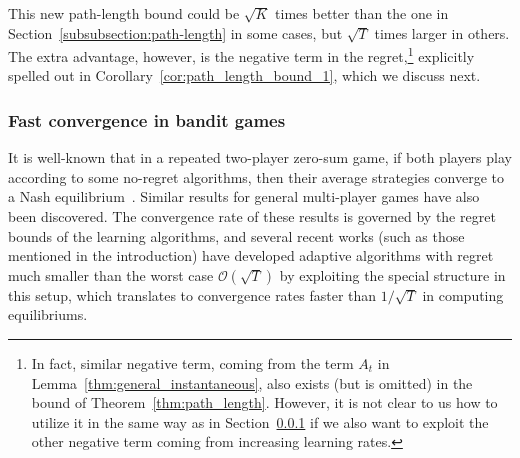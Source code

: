 \documentclass[final, 12pt]{colt2018} %
\begin{document}
This new path-length bound could be $\sqrt{K}$ times better than the one in Section~\ref{subsubsection:path-length} in some cases,
but $\sqrt{T}$ times larger in others.
The extra advantage, however, is the negative term in the regret,\footnote{%
In fact, similar negative term, coming from the term $A_t$ in Lemma~\ref{thm:general_instantaneous}, also exists (but is omitted) in the bound of Theorem~\ref{thm:path_length}.
However, it is not clear to us how to utilize it in the same way as in Section~\ref{subsection:games} if we also want to exploit the other negative term coming from increasing learning rates.
} 
explicitly spelled out in Corollary~\ref{cor:path_length_bound_1},
which we discuss next.

\subsubsection{Fast convergence in bandit games}
\label{subsection:games}

It is well-known that in a repeated two-player zero-sum game, 
if both players play according to some no-regret algorithms,
then their average strategies converge to a Nash equilibrium~\citep{freund1999adaptive}.
Similar results for general multi-player games have also been discovered.
The convergence rate of these results is governed by the regret bounds of the learning algorithms,
and several recent works (such as those mentioned in the introduction) have developed adaptive algorithms with regret much smaller than the worst case $\mathcal{O}(\sqrt{T})$ 
by exploiting the special structure in this setup,
which translates to convergence rates faster than $1/\sqrt{T}$ in computing equilibriums.


\end{document}
